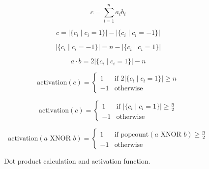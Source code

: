 \documentclass[conference]{IEEEtran}
\begin{document}
\begin{figure}[h]
    \centering
    \begin{equation}
    c = \sum_{i=1}^n a_i b_i
    \label{eq:dot_product_sum}
    \end{equation}

    \begin{equation}
    c = \left|\{c_i \mid c_i = 1\}\right| - \left|\{c_i \mid c_i = -1\}\right|
    \label{eq:dot_product_count}
    \end{equation}

    \begin{equation}
    |\{c_i \mid c_i = -1\}| = n - |\{c_i \mid c_i = 1\}|
    \label{eq:negative_count}
    \end{equation}

    \begin{equation}
    a \cdot b = 2 \left|\{c_i \mid c_i = 1\}\right| - n
    \label{eq:dot_product_simplified}
    \end{equation}

    \begin{equation}
    \text{activation}(c) = \begin{cases}
    1 & \text{if } 2 \left|\{c_i \mid c_i = 1\}\right| \geq n \\
    -1 & \text{otherwise}
    \end{cases}
    \label{eq:activation_function}
    \end{equation}

    \begin{equation}
    \text{activation}(c) = \begin{cases}
    1 & \text{if } \left|\{c_i \mid c_i = 1\}\right| \geq \frac{n}{2} \\
    -1 & \text{otherwise}
    \end{cases}
    \label{eq:activation_function_half}
    \end{equation}

    \begin{equation}
    \text{activation}(a \text{ XNOR } b) = \begin{cases}
    1 & \text{if } \text{popcount}(a \text{ XNOR } b) \geq \frac{n}{2} \\
    -1 & \text{otherwise}
    \end{cases}
    \label{eq:activation_xnor}
    \end{equation}

    \caption{Dot product calculation and activation function.}
    \label{fig:dot_product_activation}
\end{figure}
\end{document}
